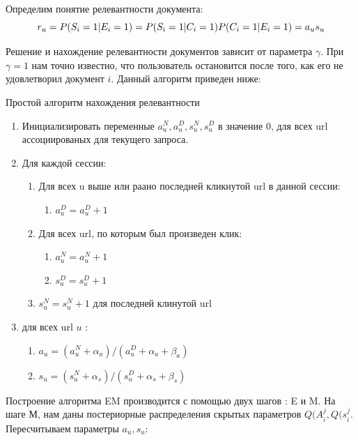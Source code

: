 Определим понятие релевантности документа:
\begin{equation}
	r_u=P(S_i=1|E_i=1)\\
	   =P(S_i=1|C_i=1)P(C_i=1|E_i=1)\\
	   =a_u s_u
\end{equation}


Решение и нахождение релевантности документов зависит от параметра $\gamma$. При $\gamma =1$ нам точно известно, что пользователь остановится после того, как его не удовлетворил документ $i$. Данный алгоритм приведен ниже:

\begin{algorithm}
  \caption{Простой алгоритм нахождения релевантности}
  \label{overall-boosting-algorithm}
  \begin{enumerate}
  \item Инициализировать переменные $a_{u}^{N},a_{u}^{D},s_{u}^{N},s_{u}^{D}$ в значение 0, для всех url ассоциированых для текущего запроса.
  \item Для каждой сессии:
    \begin{enumerate}
      \item Для всех u выше или раано последней кликнутой url в данной сессии:
      	\begin{enumerate}
      		\item $a_{u}^{D}=a_{u}^{D}+1$
      	\end{enumerate}
      \item Для всех url, по которым был произведен клик:
      	\begin{enumerate}
      		\item $a_{u}^{N}=a_{u}^{N}+1$
      		\item $s_{u}^{D}=s_{u}^{D}+1$
      	\end{enumerate}
      \item $s_{u}^{N}=s_{u}^{N}+1$ для последней клинутой url
    \end{enumerate}
    \item для всех url $u$ :
    	\begin{enumerate}
    		\item $a_u=(a_{u}^{N}+\alpha_a)/(a_{u}^{D}+\alpha_a+\beta_a)$
    		\item $s_u=(s_{u}^{N}+\alpha_s)/(s_{u}^{D}+\alpha_s+\beta_s)$
    	\end{enumerate}
  \end{enumerate}
\end{algorithm}

Построение алгоритма EM производится с помощью двух шагов : E и M.
На шаге М, нам даны постериорные распределения скрытых параметров $Q(A_{i}^{j},Q(s_{i}^{j}$. Пересчитываем параметры $a_u,s_u$:

